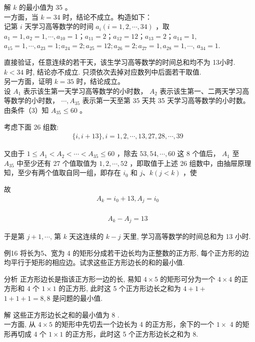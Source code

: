 \documentclass[10pt]{article}
\begin{document}
解 $k$ 的最小值为 35 。\\
一方面，当 $k=34$ 时，结论不成立。构造如下：\\
记第 $i$ 天学习高等数学的时间 $a_{i}(i=1,2, \cdots, 34)$ ，取\\
$a_{1}=1, a_{2}=1, \cdots, a_{10}=1 ； a_{11}=2 ； a_{12}=12 ； a_{13}=2 ； a_{14}=1$, $a_{15}=1, \cdots, a_{23}=1 ; a_{24}=2 ; a_{25}=12 ; a_{26}=2 ; a_{27}=1, a_{28}=1, \cdots$, $a_{34}=1$.

直接验证，任意连续的若干天，该生学习高等数学的时间总和均不为 13小时.\\
$k<34$ 时, 结论亦不成立. 只须依次去掉对应数列中后面若干取值.\\
另一方面，证明 $k=35$ 时，结论成立。\\
设 $A_{1}$ 表示该生第一天学习高等数学的小时数， $A_{2}$ 表示该生第一、二两天学习高等数学的小时数， $\cdots, A_{35}$ 表示第一天至第 35 天共 35 天学习高等数学的小时数。由条件（3）知 $A_{35} \leqslant 60$ 。

考虑下面 26 组数:\\
\begin{align*}
\{i, i+13\}, i=1,2, \cdots, 13,27,28, \cdots, 39
\end{align*}

又由于 $1 \leqslant A_{1}<A_{2}<\cdots<A_{35} \leqslant 60$ ，除去 $53,54, \cdots, 60$ 这 8 个值后， $A_{1}$ 至 $A_{35}$ 中至少还有 27 个值取值为 $1,2, \cdots, 52$ ，即取值于上述 26 组数中，由抽屉原理知，至少有两个值取自同一组，即存在 $i_{0}$ 和 $j 、 k(j<k)$ ，使

故\\
\begin{align*}
A_{k}=i_{0}+13, A_{j}=i_{0}
\end{align*}\\
\begin{align*}
A_{k}-A_{j}=13
\end{align*}

于是第 $j+1, \cdots$, 第 $k$ 天这连续的 $k-j$ 天里, 学习高等数学的时间总和为 13 小时.

例16 将长为5、宽为 4 的矩形分成若干边长均为正整数的正方形, 每个正方形的边均平行于矩形的相应边。试求这些正方形边长的和的最小值.

分析 正方形边长是指该正方形一边的长, 易知 $4 \times 5$ 的矩形可分为一个 $4 \times 4$ 的正方形和 4 个 $1 \times 1$ 的正方形, 此时这 5 个正方形边长之和为 $4+1+$ $1+1+1=8,8$ 是问题的最小值.

解 这些正方形边长之和的最小值为 8 .\\
一方面, 从 $4 \times 5$ 的矩形中先切去一个边长为 4 的正方形，余下的一个 $1 \times$ 4 的矩形再切成 4 个 $1 \times 1$ 的正方形，此时这 5 个正方形边长之和为 8.
\end{document}
